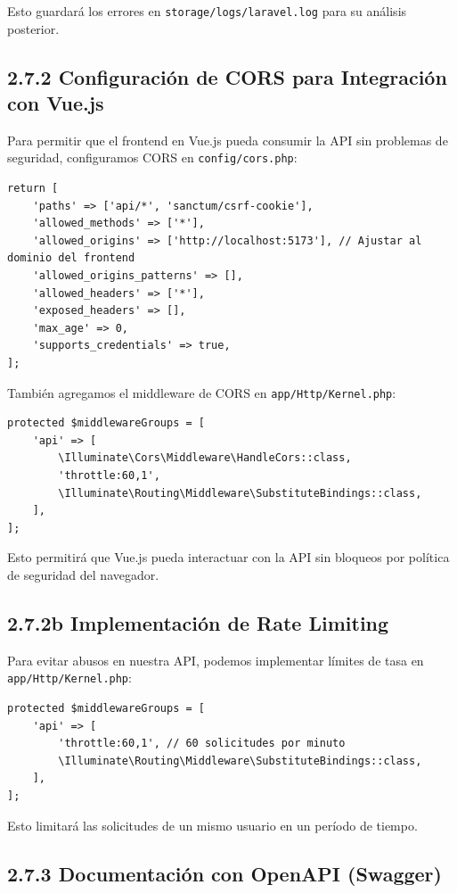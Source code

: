 \documentclass[11pt]{article}
\begin{document}
Esto guardará los errores en \texttt{storage/logs/laravel.log} para su
análisis posterior.

\subsection{2.7.2 Configuración de CORS para Integración con Vue.js}
\label{sec:orgf25338c}

Para permitir que el frontend en Vue.js pueda consumir la API sin
problemas de seguridad, configuramos CORS en \texttt{config/cors.php}:

\begin{verbatim}
return [
    'paths' => ['api/*', 'sanctum/csrf-cookie'],
    'allowed_methods' => ['*'],
    'allowed_origins' => ['http://localhost:5173'], // Ajustar al dominio del frontend
    'allowed_origins_patterns' => [],
    'allowed_headers' => ['*'],
    'exposed_headers' => [],
    'max_age' => 0,
    'supports_credentials' => true,
];
\end{verbatim}

También agregamos el middleware de CORS en \texttt{app/Http/Kernel.php}:

\begin{verbatim}
protected $middlewareGroups = [
    'api' => [
        \Illuminate\Cors\Middleware\HandleCors::class,
        'throttle:60,1',
        \Illuminate\Routing\Middleware\SubstituteBindings::class,
    ],
];
\end{verbatim}

Esto permitirá que Vue.js pueda interactuar con la API sin bloqueos
por política de seguridad del navegador.


\subsection{2.7.2b Implementación de Rate Limiting}
\label{sec:org7b891ce}

Para evitar abusos en nuestra API, podemos implementar límites de tasa
en \texttt{app/Http/Kernel.php}:

\begin{verbatim}
protected $middlewareGroups = [
    'api' => [
        'throttle:60,1', // 60 solicitudes por minuto
        \Illuminate\Routing\Middleware\SubstituteBindings::class,
    ],
];
\end{verbatim}

Esto limitará las solicitudes de un mismo usuario en un período de tiempo.

\subsection{2.7.3 Documentación con OpenAPI (Swagger)}
\label{sec:org8e8c4b2}
\end{document}
